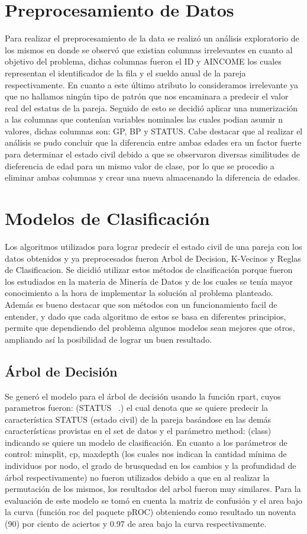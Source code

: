 \documentclass[twocolumn,showpacs,%
  nofootinbib,aps,superscriptaddress,%
  eqsecnum,prd,notitlepage,showkeys,10pt]{revtex4-1}
\begin{document}
\section{Preprocesamiento de Datos}
Para realizar el preprocesamiento de la data se realizó un análisis exploratorio de los mismos en donde se observó que existian columnas irrelevantes en cuanto al objetivo del problema, dichas columnas fueron el ID y AINCOME los cuales representan el identificador de la fila y el sueldo anual de la pareja respectivamente. En cuanto a este último atributo lo consideramos irrelevante ya que no hallamos ningún tipo de patrón que nos encaminara a predecir el valor real del estatus de la pareja. Seguido de esto se decidió aplicar una numerización a las columnas que contenían variables nominales las cuales podian asumir n valores, dichas columnas son: GP, BP y STATUS. Cabe destacar que al realizar el análisis se pudo concluir que la diferencia entre ambas edades era un factor fuerte para determinar el estado civil debido a que se observaron diversas similitudes de dieferencia de edad para un mismo valor de clase, por lo que se procedio a eliminar ambas columnas y crear una nueva almacenando la diferencia de edades.  

\section{Modelos de Clasificación}
Los algoritmos utilizados para lograr predecir el estado civil de una pareja con los datos obtenidos y ya preprocesados fueron Arbol de Decision, K-Vecinos y Reglas de Clasificacion. Se dicidió utilizar estos métodos de clasificación porque fueron los estudiados en la materia de Minería de Datos y de los cuales se tenía mayor conocimiento a la hora de implementar la solución al problema planteado. Además es bueno destacar que son métodos con un funcionamiento facil de entender, y dado que cada algoritmo de estos se basa en diferentes principios, permite que dependiendo del problema algunos modelos sean mejores que otros, ampliando así la posibilidad de lograr un buen resultado.  

\subsection{Árbol de Decisión}
Se generó el modelo para el árbol de decisión usando la función rpart,  cuyos parametros fueron: (STATUS ~.) el cual denota que se quiere predecir la característica STATUS  (estado civil) de la pareja basándose en las demás características provistas en el set de datos y el parámetro method: (class) indicando se quiere un modelo de clasificación. En cuanto a los parámetros de control: minsplit, cp, maxdepth (los cuales nos indican la cantidad mínima de individuos por nodo, el grado de brusquedad en los cambios y la profundidad de árbol respectivamente)  no fueron utilizados debido a que en al realizar la permutación de los mismos, los resultados del arbol fueron muy similares. Para la evaluación de este modelo se tomó en cuenta la matriz de confusión y el area bajo la curva (función roc del paquete pROC) obteniendo como resultado un noventa (90) por ciento de aciertos y 0.97 de area bajo la curva respectivamente. 
\end{document}
